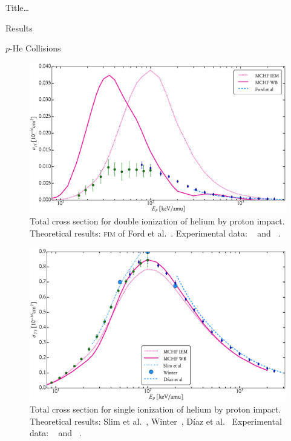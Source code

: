 \documentclass[letterpaper, 11 pt]{report}
\begin{document}
\begin{chapter}{ Title\dots \label{chap:p-he2p-he}}
\begin{section}{Results \label{sec:phe2p-res}}
\begin{subsection}{\texorpdfstring{$p$}{p}-He Collisions \label{sec:phe-res}}
         \begin{figure}[t] 
            \centering
            \includegraphics[width = 0.95 \linewidth]{./images/phe/phe-II.eps}
            \caption[Total cross section for double ionization of helium by proton impact.]
                    {Total cross section for double ionization of helium by proton impact.
                     Theoretical results: \textsc{fim} of Ford et al.~\cite{FR-94}.
                     Experimental data: {\color{OliveGreen}{$\bullet$}}~\cite{SG89} and
                     {\color{blue}{$\blacklozenge$}}~\cite{SG85}. \label{fig:phe-ii}}
         \end{figure}

         \begin{figure}[t] 
            \centering
            \includegraphics[width = 0.95 \linewidth]{./images/phe/phe-TI.eps}
            \caption[Total cross section for single ionization of helium by proton impact.]
                    {Total cross section for single ionization of helium by proton impact.
                     Theoretical results: Slim et al.~\cite{SHBF-91},
                     Winter~\cite{Winter-91}, D\'{i}az et al.~\cite{DMS-00}
                     Experimental data: {\color{OliveGreen}{$\bullet$}}~\cite{SG89} and
                     {\color{blue}{$\blacklozenge$}}~\cite{SG85}. \label{fig:phe-ti}}
         \end{figure}


\end{subsection}
\end{section}
\end{chapter}
\end{document}
